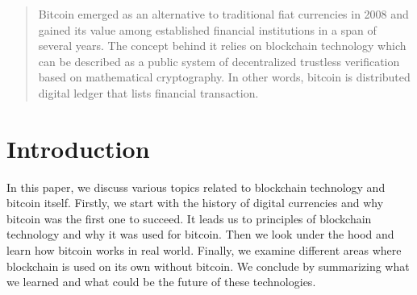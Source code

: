 \documentclass[conference,compsoc]{IEEEtran}
\begin{document}
\begin{abstract}
Bitcoin emerged as an alternative to traditional fiat currencies in 2008 and gained its value among established financial institutions in a span of several years. The concept behind it relies on blockchain technology which can be described as a public system of decentralized trustless verification based on mathematical cryptography. In other words, bitcoin is distributed digital ledger that lists financial transaction. 


\end{abstract}





%
\IEEEpeerreviewmaketitle



\section{Introduction}
In this paper, we discuss various topics related to blockchain technology and bitcoin itself. Firstly, we start with the history of digital currencies and why bitcoin was the first one to succeed. It leads us to principles of blockchain technology and why it was used for bitcoin. Then we look under the hood and learn how bitcoin works in real world. Finally, we examine different areas where blockchain is used on its own without bitcoin. We conclude by summarizing what we learned and what could be the future of these technologies.


%
%
\end{document}
